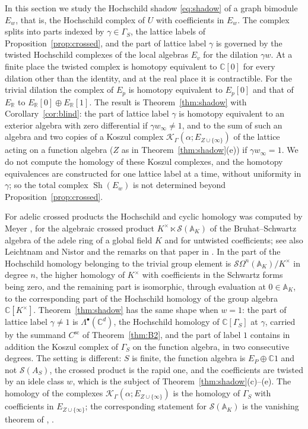 \documentclass[11pt]{amsart}
\theoremstyle{definition}
\theoremstyle{remark}
\newcommand{\C}{\mathbb C}
\newcommand{\R}{\mathbb R}
\newcommand{\Sh}{\operatorname{Sh}}
\begin{document}
In this section we study the Hochschild shadow \eqref{eq:shadow} of a graph
bimodule $E_w$, that is, the Hochschild complex of $U$ with coefficients in
$E_w$.  The complex splits into parts indexed by
$\gamma\in\Gamma_S$, the lattice labels of
Proposition~\ref{prop:crossed}, and the part of lattice label $\gamma$ is
governed by the
twisted Hochschild complexes of the local algebras $E_v$ for the dilation
$\gamma w$.  At a finite place the twisted complex is homotopy equivalent to
$\C[0]$ for every dilation other than the identity, and at the real place it
is contractible.  For the trivial dilation the complex of $E_p$ is homotopy
equivalent to $E_p[0]$ and that of $E_{\R}$ to $E_{\R}[0]\oplus E_{\R}[1]$.  The result
is Theorem~\ref{thm:shadow} with Corollary~\ref{cor:blind}: the part of
lattice label $\gamma$ is homotopy equivalent to an exterior algebra with zero
differential if $\gamma w_{\infty}\ne1$, and to the sum of such an algebra
and two copies of a Koszul complex
$\mathcal K_{\Gamma}(\alpha;E_{Z\cup\{\infty\}})$ of the lattice acting on a
function algebra ($Z$ as in Theorem~\ref{thm:shadow}(e)) if
$\gamma w_{\infty}=1$.  We do not compute the homology of
these Koszul complexes, and the homotopy equivalences are constructed for one
lattice label at a time, without uniformity in $\gamma$; so the total complex
$\Sh(E_w)$ is not determined beyond Proposition~\ref{prop:crossed}.

For adelic crossed products the Hochschild and cyclic homology was computed
by Meyer \cite{MeyerCrossed}, for the algebraic crossed product
$K^{\times}\ltimes\mathcal S(\mathbb A_K)$ of the Bruhat--Schwartz algebra of
the adele ring of a global field $K$ and for untwisted coefficients; see
also Leichtnam and Nistor \cite{LeichtnamNistor} and the remarks on that
paper in \cite[Section~1]{MeyerCrossed}.  In \cite[Section~2]{MeyerCrossed}
the part of the Hochschild homology belonging to the trivial group element is
$\mathcal S\Omega^{n}(\mathbb A_K)/K^{\times}$ in degree $n$, the higher
homology of $K^{\times}$ with coefficients in the Schwartz forms being zero,
and the remaining part is isomorphic, through evaluation at
$0\in\mathbb A_K$, to the corresponding part of the Hochschild homology of
the group algebra $\C[K^{\times}]$.  Theorem~\ref{thm:shadow} has
the same shape when $w=1$: the part of lattice label $\gamma\ne1$ is
$\Lambda^{\bullet}(\C^{d})$, the Hochschild homology of $\C[\Gamma_S]$ at
$\gamma$, carried by the summand $C^{\mathrm{sc}}$ of Theorem~\ref{thm:B2},
and the part of label $1$
contains in addition the Koszul complex of $\Gamma_S$ on the function algebra,
in two consecutive degrees.  The
setting is different: $S$ is finite, the function algebra is $E_P\oplus\C1$
and not $\mathcal S(A_S)$, the crossed product is the rapid one, and the
coefficients are twisted by an idele class $w$, which is the subject of
Theorem~\ref{thm:shadow}(c)--(e).  The homology of the complexes
$\mathcal K_{\Gamma}(\alpha;E_{Z\cup\{\infty\}})$ is the homology of $\Gamma_S$
with coefficients in $E_{Z\cup\{\infty\}}$; the corresponding statement for
$\mathcal S(\mathbb A_K)$ is the vanishing theorem of
\cite[Corollary~4.17 and Theorem~5.1]{MeyerIdele}, \cite{MeyerCrossed}.
\end{document}
